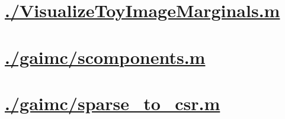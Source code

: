 \documentclass{article}
\begin{document}
    \section{\hyperref[toc]{./VisualizeToyImageMarginals.m}}
        \newpage
    \section{\hyperref[toc]{./gaimc/scomponents.m}}
        \newpage
    \section{\hyperref[toc]{./gaimc/sparse\_to\_csr.m}}
    
\end{document}

